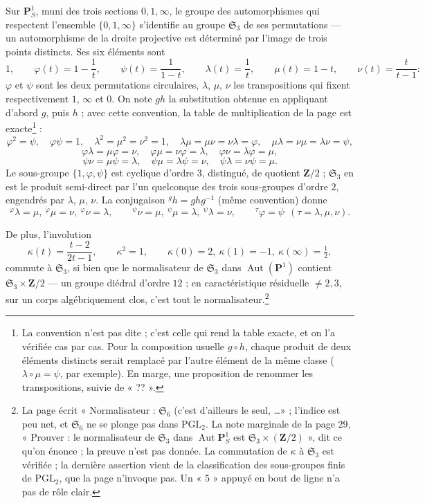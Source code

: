 \documentclass[11pt,a4paper]{article}
\begin{document}
Sur $\mathbf{P}^1_S$, muni des trois sections $0, 1, \infty$, le groupe des
automorphismes qui respectent l'ensemble $\{0, 1, \infty\}$ s'identifie au groupe
$\mathfrak{S}_3$ de ses permutations --- un automorphisme de la droite
projective est déterminé par l'image de trois points distincts. Ses six
éléments sont
\[
1,\qquad \varphi(t) = 1 - \frac1t,\qquad \psi(t) = \frac{1}{1-t},\qquad
\lambda(t) = \frac1t,\qquad \mu(t) = 1 - t,\qquad \nu(t) = \frac{t}{t-1}:
\]
$\varphi$ et $\psi$ sont les deux permutations circulaires, $\lambda$, $\mu$,
$\nu$ les transpositions qui fixent respectivement $1$, $\infty$ et $0$. On note
$gh$ la substitution obtenue en appliquant d'abord $g$, puis $h$ ; avec cette
convention, la table de multiplication de la page est exacte\footnote{La convention n'est pas dite ; c'est celle qui rend la table exacte,
et on l'a vérifiée cas par cas. Pour la composition usuelle $g \circ h$,
chaque produit de deux éléments distincts serait remplacé par l'autre élément de
la même classe ($\lambda\circ\mu = \psi$, par exemple). En marge, une
proposition de renommer les transpositions, suivie de « ?? ».} :
\[
\varphi^2 = \psi,\quad \varphi\psi = 1,\quad \lambda^2 = \mu^2 = \nu^2 = 1,
\quad \lambda\mu = \mu\nu = \nu\lambda = \varphi,\quad \mu\lambda = \nu\mu =
\lambda\nu = \psi,
\]
\[
\varphi\lambda = \mu\varphi = \nu,\quad \varphi\mu = \nu\varphi = \lambda,\quad
\varphi\nu = \lambda\varphi = \mu,
\]
\[
\psi\nu = \mu\psi = \lambda,\quad
\psi\mu = \lambda\psi = \nu,\quad \psi\lambda = \nu\psi = \mu .
\]
Le sous-groupe
$\{1, \varphi, \psi\}$ est cyclique d'ordre $3$, distingué, de quotient
$\mathbf{Z}/2$ ; $\mathfrak{S}_3$ en est le produit semi-direct par l'un
quelconque des trois sous-groupes d'ordre $2$, engendrés par $\lambda$, $\mu$,
$\nu$. La conjugaison ${}^g h = g h g^{-1}$ (même convention) donne
\[
{}^\varphi\lambda = \mu,\ {}^\varphi\mu = \nu,\ {}^\varphi\nu = \lambda,\qquad
{}^\psi\nu = \mu,\ {}^\psi\mu = \lambda,\ {}^\psi\lambda = \nu,\qquad
{}^\tau\varphi = \psi\ \ (\tau = \lambda, \mu, \nu).
\]

De plus, l'involution
\[
\kappa(t) = \frac{t-2}{2t-1}, \qquad \kappa^2 = 1, \qquad \kappa(0) = 2,\
\kappa(1) = -1,\ \kappa(\infty) = \tfrac12,
\]
commute à $\mathfrak{S}_3$, si bien que le normalisateur de $\mathfrak{S}_3$
dans $\operatorname{Aut}(\mathbf{P}^1)$ contient $\mathfrak{S}_3 \times
\mathbf{Z}/2$ --- un groupe diédral d'ordre $12$ ; en caractéristique
résiduelle $\neq 2, 3$, sur un corps algébriquement clos, c'est tout le
normalisateur.\footnote{La page écrit « Normalisateur : $\mathfrak{S}_6$ (c'est
d'ailleurs le seul, \ldots » ; l'indice est peu net, et $\mathfrak{S}_6$ ne se
plonge pas dans $\mathrm{PGL}_2$. La note marginale de la page 29, « Prouver :
le normalisateur de $\mathfrak{S}_3$ dans $\operatorname{Aut}\mathbf{P}^1_S$ est
$\mathfrak{S}_3 \times (\mathbf{Z}/2)$ », dit ce qu'on énonce ; la preuve n'est
pas donnée. La commutation de $\kappa$ à $\mathfrak{S}_3$ est vérifiée ; la
dernière assertion vient de la classification des sous-groupes finis de
$\mathrm{PGL}_2$, que la page n'invoque pas. Un « 5 » appuyé en bout de ligne
n'a pas de rôle clair.}
\end{document}
